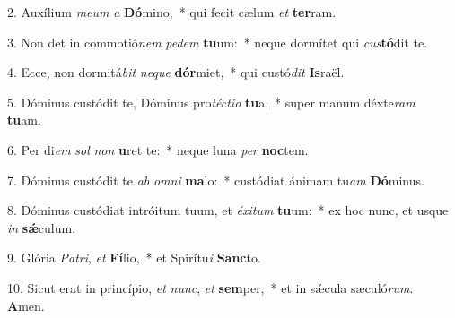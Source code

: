 2. Auxílium \textit{me}\textit{um} \textit{a} \textbf{Dó}mino,~*  qui fecit cælum \textit{et} \textbf{ter}ram.\

3. Non det in commotió\textit{nem} \textit{pe}\textit{dem} \textbf{tu}um:~*  neque dormítet qui \textit{cus}\textbf{tó}dit te.\

4. Ecce, non dormitá\textit{bit} \textit{ne}\textit{que} \textbf{dór}miet,~*  qui custó\textit{dit} \textbf{Is}raël.\

5. Dóminus custódit te, Dóminus pro\textit{téc}\textit{ti}\textit{o} \textbf{tu}a,~*  super manum déxte\textit{ram} \textbf{tu}am.\

6. Per di\textit{em} \textit{sol} \textit{non} \textbf{u}ret te:~*  neque luna \textit{per} \textbf{noc}tem.\

7. Dóminus custódit te \textit{ab} \textit{om}\textit{ni} \textbf{ma}lo:~*  custódiat ánimam tu\textit{am} \textbf{Dó}minus.\

8. Dóminus custódiat intróitum tuum, et \textit{éx}\textit{i}\textit{tum} \textbf{tu}um:~*  ex hoc nunc, et usque \textit{in} \textbf{sǽ}culum.\

9. Glória \textit{Pa}\textit{tri}, \textit{et} \textbf{Fí}lio,~*  et Spirítu\textit{i} \textbf{Sanc}to.\

10. Sicut erat in princípio, \textit{et} \textit{nunc}, \textit{et} \textbf{sem}per,~*  et in sǽcula sæculó\textit{rum}. \textbf{A}men.\


